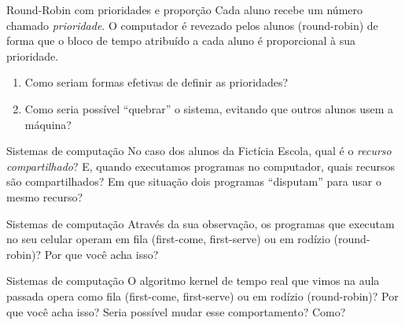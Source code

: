\documentclass{beamer}
\begin{document}
\begin{frame}[fragile]{Round-Robin com prioridades e proporção}
  \centering
  \large
  Cada aluno recebe um número chamado \textit{prioridade}. O computador é
  revezado pelos alunos (round-robin) de forma que o bloco de tempo atribuído a
  cada aluno é proporcional à sua prioridade.
  \begin{enumerate}
  \item Como seriam formas efetivas de definir as prioridades?
  \item Como seria possível ``quebrar'' o sistema, evitando que outros alunos
    usem a máquina?
  \end{enumerate}
\end{frame}

\begin{frame}[fragile]{Sistemas de computação}
  \centering
  \Large
  No caso dos alunos da Fictícia Escola, qual é o \textit{recurso
  compartilhado}? E, quando executamos programas no computador, quais recursos
  são compartilhados? Em que situação dois programas ``disputam'' para usar o
  mesmo recurso?
\end{frame}

\begin{frame}[fragile]{Sistemas de computação}
  \centering
  \Large
  Através da sua observação, os programas que executam no seu celular operam em
  fila (first-come, first-serve) ou em rodízio (round-robin)? Por que você acha
  isso?
\end{frame}

\begin{frame}[fragile]{Sistemas de computação}
  \centering
  \Large
  O algoritmo kernel de tempo real que vimos na aula passada opera como fila
  (first-come, first-serve) ou em rodízio (round-robin)? Por que você acha isso?
  Seria possível mudar esse comportamento? Como?
\end{frame}
\end{document}
